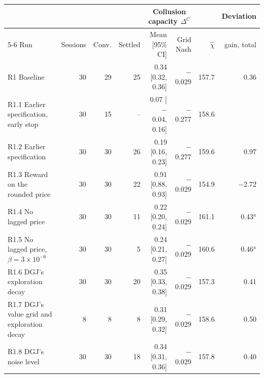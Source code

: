 \begin{tabular}{@{}lrrrrrrr@{}}
\toprule
 &  &  &  & \multicolumn{2}{c}{Collusion capacity $\Delta^C$} &  & Deviation \\
\cmidrule(lr){5-6}
Run & Sessions & Conv. & Settled & Mean [95\% CI] & Grid Nash & $\hat\chi$ & gain, total \\
\midrule
R1 Baseline & 30 & 29 & 25 & 0.34 [0.32, 0.36] & $-$0.029 & 157.7 & 0.36 \\
R1.1 Earlier specification, early stop & 30 & 15 & – & 0.07 [$-$0.04, 0.16] & $-$0.277 & 158.6 &  \\
R1.2 Earlier specification & 30 & 30 & 26 & 0.19 [0.16, 0.23] & $-$0.277 & 159.6 & 0.97 \\
R1.3 Reward on the rounded price & 30 & 30 & 22 & 0.91 [0.88, 0.93] & $-$0.029 & 154.9 & $-$2.72 \\
R1.4 No lagged price & 30 & 30 & 11 & 0.22 [0.20, 0.24] & $-$0.029 & 161.1 & 0.43$^{a}$ \\
R1.5 No lagged price, $\beta = 3\times10^{-6}$ & 30 & 30 & 5 & 0.24 [0.21, 0.27] & $-$0.029 & 160.6 & 0.46$^{a}$ \\
R1.6 DGJ's exploration decay & 30 & 30 & 20 & 0.35 [0.33, 0.38] & $-$0.029 & 157.3 & 0.41 \\
R1.7 DGJ's value grid and exploration decay & 8 & 8 & 8 & 0.31 [0.29, 0.32] & $-$0.029 & 158.6 & 0.50 \\
R1.8 DGJ's noise level & 30 & 30 & 18 & 0.34 [0.31, 0.36] & $-$0.029 & 157.8 & 0.40 \\
\bottomrule
\end{tabular}
